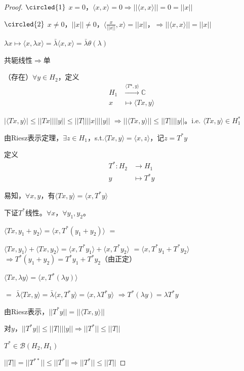 \documentclass[lang=cn,a4paper,newtx,section]{elegantbook}
\begin{document}
\begin{proof}
  $\circled{1}$ $x = 0$，$\langle x, x \rangle = 0 \Rightarrow ||\langle x, x \rangle|| = 0 = ||x||$
  
  $\circled{2}$ $x \neq 0$，$||x|| \neq 0$，$\langle \frac{x}{||x||}, x \rangle = ||x||$，$\Rightarrow ||\langle x, x \rangle|| = ||x||$
  
  $\lambda x \mapsto \langle x, \lambda x \rangle = \bar{\lambda}\langle x, x \rangle = \bar{\lambda}\theta(\lambda)$
  
  共轭线性$\Rightarrow$单
  
  （存在）$\forall y \in H_2$，定义
  \begin{equation*}
    \begin{aligned}
      H_1 &\xrightarrow{\langle T*, y \rangle} \mathbb{C} \\
      x &\longmapsto \langle Tx, y \rangle
    \end{aligned}
  \end{equation*}
  
  $|\langle Tx, y \rangle| \leq ||Tx|| ||y|| \leq ||T|| ||x|| ||y||$
 $\Rightarrow ||\langle T x, y \rangle|| \leq ||T|| ||y||$。i.e. $\langle T x, y \rangle \in H_1^*$
  
  由Riesz表示定理，$\exists z \in H_1$，s.t.$\langle T x, y \rangle = \langle x, z \rangle$，记$z = T^*y$
  
  定义
  \begin{equation*}
    \begin{aligned}
      T^*: H_2 &\longrightarrow H_1 \\
      y &\longmapsto T^*y
    \end{aligned}
  \end{equation*}
  
  易知，$\forall x, y$，有$\langle Tx, y \rangle = \langle x, T^*y \rangle$
  
  下证$T^*$线性。$\forall x$，$\forall y_1, y_2$。
  
  $\langle T x, y_1 + y_2 \rangle = \langle x, T^*(y_1 + y_2) \rangle$
   $=$

  $\langle Tx, y_1 \rangle + \langle Tx, y_2 \rangle = \langle x, T^*y_1 \rangle + \langle x, T^*y_2 \rangle$
   $= \langle x, T^*y_1 + T^*y_2 \rangle$
   $\Rightarrow T^*(y_1 + y_2) = T^*y_1 + T^*y_2$（由正定）
  
  $\langle Tx, \lambda y \rangle = \langle x, T^*(\lambda y) \rangle$
  
  $=$
  $\bar{\lambda}\langle Tx, y \rangle = \bar{\lambda}\langle x, T^*y \rangle = \langle x, \lambda T^*y \rangle$
  $\Rightarrow T^*(\lambda y) = \lambda T^*y$
  
  由Riesz表示，$||T^*y|| = ||\langle T x, y \rangle||$
  
  对$y$，$||T^*y|| \leq ||T|| ||y|| \Rightarrow ||T^*|| \leq ||T||$
  
  $T^* \in \mathcal{B}(H_2, H_1)$
  
  $||T|| = ||T^{**}|| \leq ||T^*|| \Rightarrow ||T^*|| \leq ||T||$
\end{proof}
\end{document}
